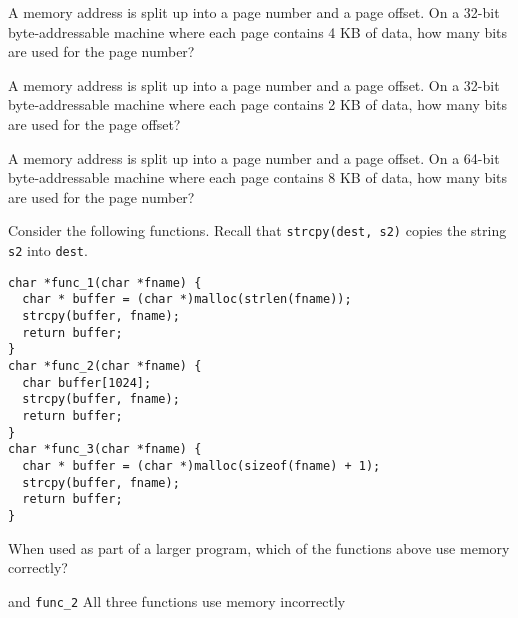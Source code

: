 \variant
A memory address is split up into a page number and a page offset. On a 32-bit byte-addressable machine where each page contains 4 KB of data, how many bits are used for the page number?
\begin{answers}
\end{answers}
\begin{solution}
\end{solution}

\variant
A memory address is split up into a page number and a page offset. On a 32-bit byte-addressable machine where each page contains 2 KB of data, how many bits are used for the page offset?
\begin{answers}
\end{answers}
\begin{solution}
\end{solution}

\variant
A memory address is split up into a page number and a page offset. On a 64-bit byte-addressable machine where each page contains 8 KB of data, how many bits are used for the page number?
\begin{answers}
\end{answers}
\begin{solution}
\end{solution}

\variant
Consider the following functions.  Recall that {\tt strcpy(dest, s2)} copies the string {\tt s2} into {\tt dest}.
\begin{verbatim}
char *func_1(char *fname) {
  char * buffer = (char *)malloc(strlen(fname));
  strcpy(buffer, fname);
  return buffer;
}
char *func_2(char *fname) {
  char buffer[1024];
  strcpy(buffer, fname);
  return buffer;
}
char *func_3(char *fname) {
  char * buffer = (char *)malloc(sizeof(fname) + 1);
  strcpy(buffer, fname);
  return buffer;
}
\end{verbatim}

When used as part of a larger program, which of the functions above use memory correctly?
\begin{answers}
 and {\tt func_2}
\correctanswer All three functions use memory incorrectly
\end{answers}
\begin{solution}
\end{solution}

